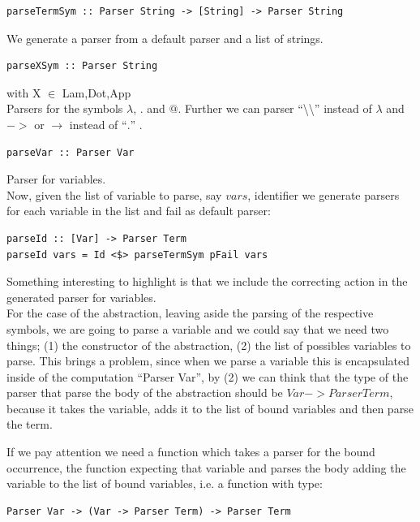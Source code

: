 \documentclass[a4paper,10pt]{article}
\begin{document}
\begin{lstlisting}
parseTermSym :: Parser String -> [String] -> Parser String
\end{lstlisting}
We generate a parser from a default parser and a list of strings.

\begin{lstlisting}
parseXSym :: Parser String
\end{lstlisting} with X $\in$ {Lam,Dot,App}\\
Parsers for the symbols $\lambda$, $.$ and $@$. Further we can
parser ``\textbackslash \textbackslash'' instead of $\lambda$ and $->$ or $\rightarrow$
instead of ``$.$'' .

\begin{lstlisting}
parseVar :: Parser Var
\end{lstlisting} Parser for variables.\\

Now, given the list of variable to parse, say $vars$, identifier
we generate parsers for each variable in the list and fail as default parser:

\begin{lstlisting}
parseId :: [Var] -> Parser Term
parseId vars = Id <$> parseTermSym pFail vars
\end{lstlisting}

Something interesting to highlight is that we include the correcting action in
the generated parser for variables.\\

For the case of the abstraction, leaving aside the parsing of the respective symbols,
we are going to parse a variable and we could say that we need two things;
(1) the constructor of the abstraction, (2) the list of possibles variables to parse.
This brings a problem, since when we parse a variable this is encapsulated inside
of the computation ``Parser Var'', by (2) we can think that the type of the parser
that parse the body of the abstraction should be $Var -> Parser Term$, because it takes the
variable, adds it to the list of bound variables and then parse the term.

If we pay attention we need a function which takes a parser for the bound occurrence,
the function expecting that variable and parses the body adding the variable to the
list of bound variables, i.e. a function with type:

\begin{lstlisting}
Parser Var -> (Var -> Parser Term) -> Parser Term
\end{lstlisting}
\end{document}
